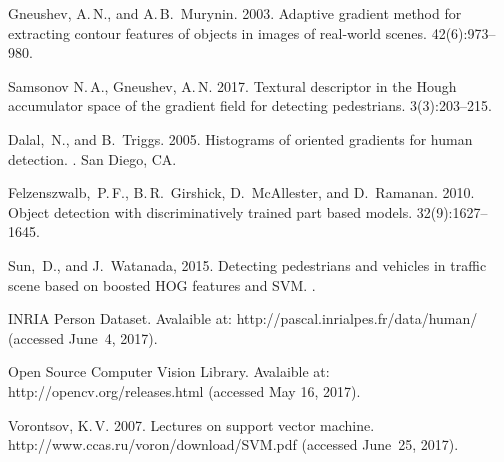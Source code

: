 \documentclass[12pt,twoside]{article}
\begin{document}
\bigskip
\maketitleSecondary




\begin{thebibliography}{99}
Gneushev, A.\,N., and A.\,B.~Murynin.	
2003. Adaptive gradient method for extracting contour features of
objects in images of real-world scenes.
 42(6):973--980.

Samsonov N.\,A., Gneushev, A.\,N.	
2017. Textural descriptor in the Hough accumulator space of the gradient field for detecting pedestrians.
 3(3):203--215.


Dalal,~N., and B.~Triggs. 2005.
 Histograms of oriented gradients for
human detection. . San Diego, CA.

	{Felzenszwalb,~P.\,F., B.\,R.~Girshick, D.~McAllester,
	and D.~Ramanan}. 2010.
	Object detection with discriminatively trained part based models.
 32(9):1627--1645.

	{Sun,~D., and J.~Watanada}, 2015.
	Detecting pedestrians and vehicles in traffic scene based on
	boosted HOG features and SVM.
.

	INRIA Person Dataset.
	Avalaible at: {\sf http://pascal.inrialpes.fr/data/human/}
	(accessed June~4, 2017).

	Open Source Computer Vision Library.
	Avalaible at: {\sf http://opencv.org/releases.html}
	(accessed May 16, 2017).
	
	Vorontsov, K.\,V. 2007. Lectures on support vector machine.
	{\sf http://www.ccas.ru/voron/download/\linebreak SVM.pdf}
	(accessed June~25, 2017).

\end{thebibliography}

\end{document}
